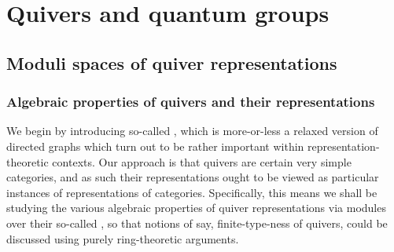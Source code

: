 \section{Quivers and quantum groups}
    \subsection{Moduli spaces of quiver representations}
        \subsubsection{Algebraic properties of quivers and their representations}
            We begin by introducing so-called , which is more-or-less a relaxed version of directed graphs which turn out to be rather important within representation-theoretic contexts. Our approach is that quivers are certain very simple categories, and as such their representations ought to be viewed as particular instances of representations of categories. Specifically, this means we shall be studying the various algebraic properties of quiver representations via modules over their so-called , so that notions of say, finite-type-ness of quivers, could be discussed using purely ring-theoretic arguments.
        
